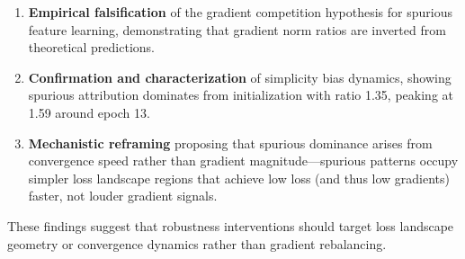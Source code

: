 \begin{enumerate}
    \item \textbf{Empirical falsification} of the gradient competition hypothesis for spurious feature learning, demonstrating that gradient norm ratios are inverted from theoretical predictions.

    \item \textbf{Confirmation and characterization} of simplicity bias dynamics, showing spurious attribution dominates from initialization with ratio 1.35, peaking at 1.59 around epoch 13.

    \item \textbf{Mechanistic reframing} proposing that spurious dominance arises from convergence speed rather than gradient magnitude---spurious patterns occupy simpler loss landscape regions that achieve low loss (and thus low gradients) faster, not louder gradient signals.
\end{enumerate}

These findings suggest that robustness interventions should target loss landscape geometry or convergence dynamics rather than gradient rebalancing.
